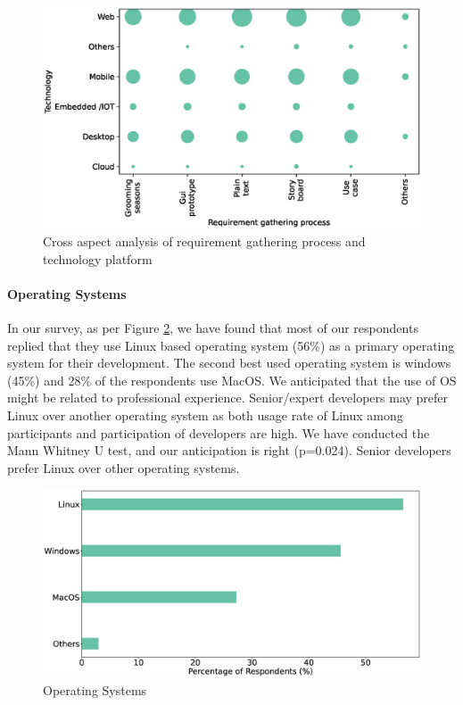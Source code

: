 \begin{figure}[h]
\centering
  \includegraphics[scale=0.47]{Figures/Requirement_Technology_Cross_Analysis.eps}
  \caption{Cross aspect analysis of requirement gathering process and technology platform}
  \label{fig:requirement technology cross analysis}
\end{figure}



\paragraph{Operating Systems}
In our survey, as per Figure \ref{fig:os}, we have found that most of our respondents replied that they use Linux based operating system (56\%) as a primary operating system for their development. The second best used operating system is windows (45\%) and 28\% of the respondents use MacOS. We anticipated that the use of OS might be related to professional experience. Senior/expert developers may prefer Linux over another operating system as both usage rate of Linux among participants and participation of developers are high. We have conducted the Mann Whitney U test, and our anticipation is right (p=0.024). Senior developers prefer Linux over other operating systems.

\begin{figure}[h]
\centering
  \includegraphics[scale=0.17]{Figures/Respondents_os}
  \caption{Operating Systems}
  \label{fig:os}
\end{figure}


